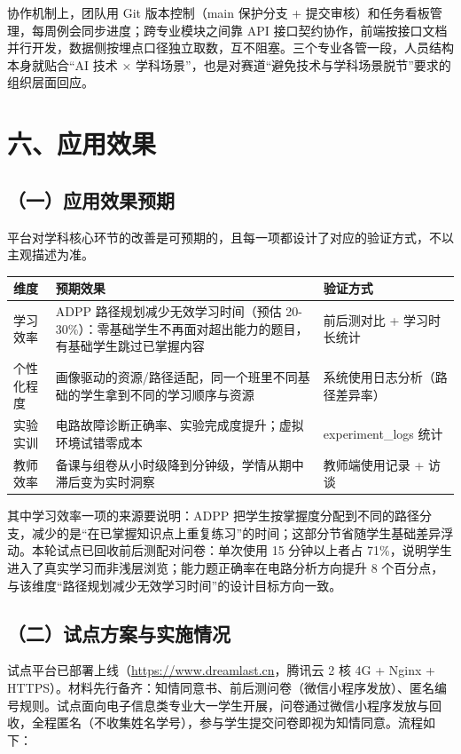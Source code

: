 \documentclass[zihao=-4,a4paper,UTF8,fontset=windows]{ctexart}
\begin{document}
协作机制上，团队用 Git 版本控制（main 保护分支 + 提交审核）和任务看板管理，每周例会同步进度；跨专业模块之间靠 API 接口契约协作，前端按接口文档并行开发，数据侧按埋点口径独立取数，互不阻塞。三个专业各管一段，人员结构本身就贴合“AI 技术 × 学科场景”，也是对赛道“避免技术与学科场景脱节”要求的组织层面回应。

\section{六、应用效果}
\subsection{（一）应用效果预期}


平台对学科核心环节的改善是可预期的，且每一项都设计了对应的验证方式，不以主观描述为准。

\par\noindent\begin{tabular}{|p{3.0cm}|p{4.5cm}|p{6.2cm}|}
\hline
\textbf{维度} & \textbf{预期效果} & \textbf{验证方式} \\ \hline
学习效率 & ADPP 路径规划减少无效学习时间（预估 20-30\%）：零基础学生不再面对超出能力的题目，有基础学生跳过已掌握内容 & 前后测对比 + 学习时长统计 \\ \hline
个性化程度 & 画像驱动的资源/路径适配，同一个班里不同基础的学生拿到不同的学习顺序与资源 & 系统使用日志分析（路径差异率） \\ \hline
实验实训 & 电路故障诊断正确率、实验完成度提升；虚拟环境试错零成本 & experiment\_logs 统计 \\ \hline
教师效率 & 备课与组卷从小时级降到分钟级，学情从期中滞后变为实时洞察 & 教师端使用记录 + 访谈 \\ \hline
\end{tabular}\par


其中学习效率一项的来源要说明：ADPP 把学生按掌握度分配到不同的路径分支，减少的是“在已掌握知识点上重复练习”的时间；这部分节省随学生基础差异浮动。本轮试点已回收前后测配对问卷：单次使用 15 分钟以上者占 71\%，说明学生进入了真实学习而非浅层浏览；能力题正确率在电路分析方向提升 8 个百分点，与该维度“路径规划减少无效学习时间”的设计目标方向一致。

\subsection{（二）试点方案与实施情况}


试点平台已部署上线（\url{https://www.dreamlast.cn}，腾讯云 2 核 4G + Nginx + HTTPS）。材料先行备齐：知情同意书、前后测问卷（微信小程序发放）、匿名编号规则。试点面向电子信息类专业大一学生开展，问卷通过微信小程序发放与回收，全程匿名（不收集姓名学号），参与学生提交问卷即视为知情同意。流程如下：
\end{document}
